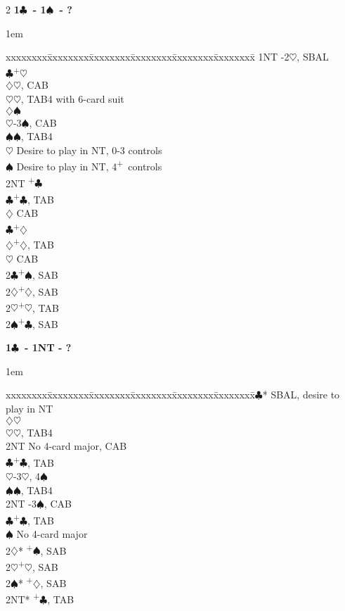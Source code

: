 \documentclass[10pt]{article}
\renewcommand{\c}{$\clubsuit$}
\renewcommand{\d}{$\diamondsuit$}
\newcommand{\h}{$\heartsuit$}
\newcommand{\s}{$\spadesuit$}
\newcommand{\p}{\textsuperscript{+}}
\newenvironment{bidtable}[1][]
{\textbf{#1}
  \begin{adjustwidth}{1em}{}
    \addvspace{2pt}
    \begin{tabbing}
      xxxxxxxx\=xxxxxxxx\=xxxxxxxx\=xxxxxxxx\=xxxxxxxx\=xxxxxxxx\=\kill}
{\end{tabbing}\end{adjustwidth}\bigskip}%
\begin{document}
\begin{multicols*}{2}
\begin{bidtable}[1\c\ - 1\s\ - ?]
1NT -2\h, SBAL                                \\
    \c {}\p\h                               \\
    \>     \d {}\h, CAB                     \\
    \>     \h {}\h, TAB4 with 6-card suit   \\
    \d {}\s                                 \\
    \>     \h {}-3\s, CAB                   \\
    \>     \s {}\s, TAB4                    \\
    \h \> Desire to play in NT, 0-3 controls  \\
    \s \> Desire to play in NT, 4\p\ controls \\
    \> 2NT \p\c                               \\
    \>     \c {}\p\c, TAB                   \\
    \>     \d \> CAB                          \\
    \c {}\p\d                               \\
    \>     \d {}\p\d, TAB                   \\
    \>     \h \> CAB                          \\
2\c {}\p\s, SAB                                 \\
2\d {}\p\d, SAB                                 \\
2\h {}\p\h, TAB                                 \\
2\s {}\p\c, SAB
\end{bidtable}

\begin{bidtable}[1\c\ - 1NT - ?]
2\c* \> SBAL, desire to play in NT         \\
    \d {}\h                         \\
    \>     \h {}\h, TAB4            \\
    \>     \> 2NT \> No 4-card major, CAB \\
    \>     \c {}\p\c, TAB           \\
    \h {}-3\h, 4\s                  \\
    \>     \s {}\s, TAB4            \\
    \>     \> 2NT -3\s, CAB           \\
    \>     \c {}\p\c, TAB           \\
    \s \> No 4-card major             \\
2\d* {}\p\s, SAB                         \\
2\h {}\p\h, SAB                         \\
2\s* {}\p\d, SAB                         \\
2NT* \p\c, TAB
\end{bidtable}


\end{multicols*}
\end{document}
